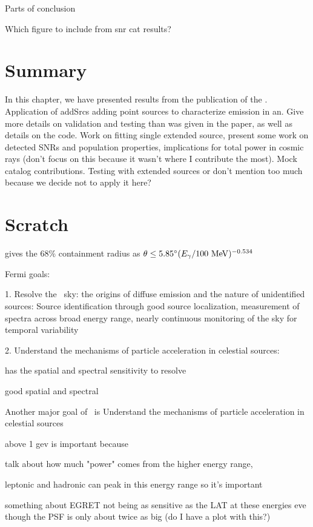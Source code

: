 {Parts of conclusion

Which figure to include from snr cat results?


\section{Summary}\label{snrCat:summ}
In this chapter, we have presented results from the publication of the \snrcat. Application of addSrcs adding point sources to characterize emission in an\roi. Give more details on validation and testing than was given in the paper, as well as details on the code. Work on fitting single extended source, present some work on detected SNRs and population properties, implications for total power in cosmic rays (don't focus on this because it wasn't where I contribute the most). Mock catalog contributions. Testing with extended sources or don't mention too much because we decide not to apply it here?


\section{Scratch}
\cite{Thomson93} gives the 68\% containment radius as $\theta \leq 5.85^\circ (E_\gamma /100 ~\mathrm{MeV} )^{-0.534}$

Fermi goals:

1. Resolve the \gam~sky: the origins of diffuse emission and the nature of unidentified sources: Source identification through good source localization, measurement of spectra across broad energy range, nearly continuous monitoring of the sky for temporal variability 

2. Understand the mechanisms of particle acceleration in celestial sources: 

has the spatial and spectral sensitivity to resolve

good spatial and spectral 


Another major goal of \Fermi~is Understand the mechanisms of particle acceleration in celestial sources 



above 1 gev is important because

talk about how much "power" comes from the higher energy  range,

leptonic and hadronic can peak in this energy range so it's important

something about EGRET not being as sensitive as the LAT at these energies eve though the PSF is only about twice as big (do I have a plot with this?)

}
